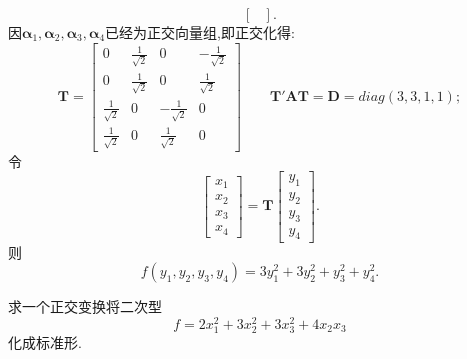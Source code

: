 \documentclass[lang=cn,11pt,normal]{elegantbook}
\newcommand{\DD}{\boldsymbol{D}}
\newcommand{\TT}{\boldsymbol{T}}
\begin{document}
\begin{solution}
\begin{equation}
\begin{bmatrix}
		\end{bmatrix}.
		\end{equation}
		因$\boldsymbol{\alpha}_1,\boldsymbol{\alpha}_2,\boldsymbol{\alpha}_3,\boldsymbol{\alpha}_4$已经为正交向量组,即正交化得:
		\begin{equation}
		\TT=
		\begin{bmatrix}
		0&\frac{1}{\sqrt{2}}&0&-\frac{1}{\sqrt{2}}\\
		0&\frac{1}{\sqrt{2}}&0&\frac{1}{\sqrt{2}}\\
		\frac{1}{\sqrt{2}}&0&-\frac{1}{\sqrt{2}}&0\\
		\frac{1}{\sqrt{2}}&0&\frac{1}{\sqrt{2}}&0
		\end{bmatrix}
		\qquad\TT'\boldsymbol{AT}=\DD=diag(3,3,1,1);
		\end{equation}
		令
		\begin{equation}
		\begin{bmatrix}
		x_1\\x_2\\x_3\\x_4
		\end{bmatrix}
		=
		\TT
		\begin{bmatrix}
		y_1\\y_2\\y_3\\y_4
		\end{bmatrix}.
		\end{equation}
		则
		\begin{equation}
		f(y_1,y_2,y_3,y_4)=3y_1^2+3y_2^2+y_3^2+y_4^2.
		\end{equation}
	\end{solution}
	\begin{exercise}
		求一个正交变换将二次型
		\begin{equation}
		f=2x_1^2+3x_2^2+3x_3^2+4x_2x_3
		\end{equation}
		化成标准形.
	\end{exercise}
\end{document}

